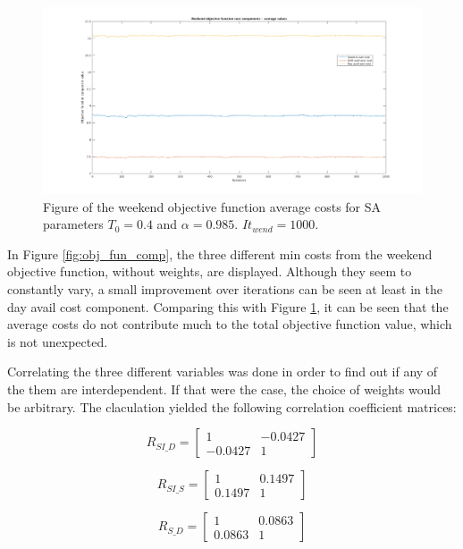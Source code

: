 \begin{figure}[!h]
\centering
\includegraphics[width=\textwidth, trim = 100px 50px 100px 20px, clip]{Chapters/ImagesEmelie/Components_av_1000_20.png}
\caption{Figure of the weekend objective function average costs for SA parameters $T_0 = 0.4$ and $\alpha = 0.985$. $It_{wend} = 1000$.}
\label{fig:obj_fun_comp_aver}
\end{figure}


In Figure \ref{fig:obj_fun_comp}, the three different min costs from the weekend objective function, without weights, are displayed. Although they seem to constantly vary, a small improvement over iterations can be seen at least in the day avail cost component. Comparing this with Figure \ref{fig:obj_fun_comp_aver}, it can be seen that the average costs do not contribute much to the total objective function value, which is not unexpected.

Correlating the three different variables was done in order to find out if any of the them are interdependent. If that were the case, the choice of weights would be arbitrary. The claculation yielded the following correlation coefficient matrices:

\begin{equation}
  R_{SI\_D} =
  \begin{bmatrix}
 	 1  &  -0.0427 \\
 	 -0.0427  &  1
 \end{bmatrix}
\end{equation}

 \begin{equation}
 R_{SI\_S} =
 \begin{bmatrix}
	 1  &  0.1497 \\
	 0.1497  &  1
 \end{bmatrix}
 \end{equation}
 
\begin{equation}
 R_{S\_D} =
 \begin{bmatrix}
	 1  &  0.0863 \\
	 0.0863  &  1
 \end{bmatrix}
 \end{equation} 
 
